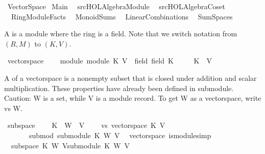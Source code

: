 %
\begin{isabellebody}%
\def\isabellecontext{VectorSpace}%
%
\isamarkuptrue%
%
\isadelimtheory
%
\endisadelimtheory
%
\isatagtheory
{}\isamarkupfalse%
\ VectorSpace\isanewline
{}\ Main\isanewline
\ \ {\isachardoublequoteopen}{\isachartilde}{\isachartilde}{\isacharslash}src{\isacharslash}HOL{\isacharslash}Algebra{\isacharslash}Module{\isachardoublequoteclose}\isanewline
\ \ {\isachardoublequoteopen}{\isachartilde}{\isachartilde}{\isacharslash}src{\isacharslash}HOL{\isacharslash}Algebra{\isacharslash}Coset{\isachardoublequoteclose}\isanewline
\ \ RingModuleFacts\isanewline
\ \ MonoidSums\isanewline
\ \ LinearCombinations\isanewline
\ \ SumSpaces\isanewline
{}%
\endisatagtheory
{\isafoldtheory}%
%
\isadelimtheory
%
\endisadelimtheory
%
\isamarkuptrue%
%
\begin{isamarkuptext}%
A  is a module where the ring is a field. 
Note that we switch notation from $(R, M)$ to $(K, V)$.%
\end{isamarkuptext}%
\isamarkuptrue%
\isamarkupfalse%
\ vectorspace\ {\isacharequal}\ \isanewline
\ \ module{\isacharcolon}\ module\ K\ V\ {\isacharplus}\ field{\isacharcolon}\ field\ K\ \ \isanewline
\ \ \ K\ \ V%
\begin{isamarkuptext}%
A  of a vectorspace is a nonempty subset 
that is closed under addition and scalar multiplication. These properties
have already been defined in submodule. Caution: W is a set, while V is 
a module record. To get W as a vectorspace, write vs W.%
\end{isamarkuptext}%
\isamarkuptrue%
\isamarkupfalse%
\ subspace\ {\isacharequal}\isanewline
\ \ \ K\ \ W\ \ V\ {\isacharparenleft}\isanewline
\ \ \ vs{\isacharcolon}\ {\isachardoublequoteopen}vectorspace\ K\ V{\isachardoublequoteclose}\isanewline
\ \ \ \ \ \ \ submod{\isacharcolon}\ {\isachardoublequoteopen}submodule\ K\ W\ V{\isachardoublequoteclose}\isanewline
\isanewline
\isanewline
{}\isamarkupfalse%
\ {\isacharparenleft}\ vectorspace{\isacharparenright}\ is{\isacharunderscore}module{\isacharbrackleft}simp{\isacharbrackright}{\isacharcolon}\isanewline
\ \ {\isachardoublequoteopen}subspace\ K\ W\ V{\isasymLongrightarrow}submodule\ K\ W\ V{\isachardoublequoteclose}\isanewline

\end{isabellebody}
